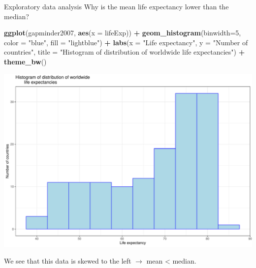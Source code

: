 \documentclass[
  ignorenonframetext,
]{beamer}
\newenvironment{Shaded}{\begin{snugshade}}{\end{snugshade}}
\newcommand{\AttributeTok}[1]{\textcolor[rgb]{0.13,0.29,0.53}{#1}}
\newcommand{\DecValTok}[1]{\textcolor[rgb]{0.00,0.00,0.81}{#1}}
\newcommand{\FunctionTok}[1]{\textcolor[rgb]{0.13,0.29,0.53}{\textbf{#1}}}
\newcommand{\NormalTok}[1]{#1}
\newcommand{\SpecialCharTok}[1]{\textcolor[rgb]{0.81,0.36,0.00}{\textbf{#1}}}
\newcommand{\StringTok}[1]{\textcolor[rgb]{0.31,0.60,0.02}{#1}}
\begin{document}
\begin{frame}[fragile]{Exploratory data analysis}
\protect\hypertarget{exploratory-data-analysis-4}{}
Why is the mean life expectancy lower than the median?

\small

\begin{Shaded}
\begin{Highlighting}[]
\FunctionTok{ggplot}\NormalTok{(gapminder2007, }\FunctionTok{aes}\NormalTok{(}\AttributeTok{x =}\NormalTok{ lifeExp)) }\SpecialCharTok{+}
  \FunctionTok{geom\_histogram}\NormalTok{(}\AttributeTok{binwidth=}\DecValTok{5}\NormalTok{, }\AttributeTok{color =} \StringTok{"blue"}\NormalTok{, }\AttributeTok{fill =} \StringTok{"lightblue"}\NormalTok{) }\SpecialCharTok{+}
  \FunctionTok{labs}\NormalTok{(}\AttributeTok{x =} \StringTok{"Life expectancy"}\NormalTok{, }\AttributeTok{y =} \StringTok{"Number of countries"}\NormalTok{,}
       \AttributeTok{title =} \StringTok{"Histogram of distribution of worldwide }
\StringTok{       life expectancies"}\NormalTok{) }\SpecialCharTok{+}
  \FunctionTok{theme\_bw}\NormalTok{()}
\end{Highlighting}
\end{Shaded}

\begin{center}\includegraphics[width=0.4\linewidth,height=0.3\textheight]{Week5_Lect_files/figure-beamer/unnamed-chunk-6-1} \end{center}
\normalsize

We see that this data is skewed to the left \(\rightarrow\) mean
\textless{} median.
\end{frame}
\end{document}
